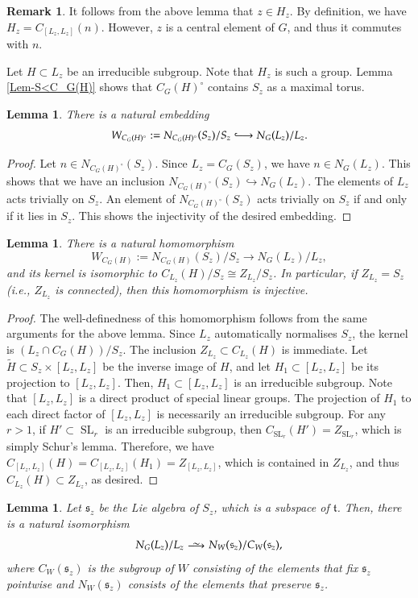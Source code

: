 \documentclass[11pt,oneside,dvipsnames]{amsart}
\theoremstyle{plain}
\newtheorem{Lem}[Thm]{Lemma}
\theoremstyle{definition}
\newtheorem{Rem}[Thm]{Remark}
\theoremstyle{named}
\DeclareMathOperator{\lisom}{\!\!\smash{\begin{array}{c}\sim\\[-1em]
\longrightarrow\end{array}}\!\!}
\DeclareMathOperator{\SL}{SL}
\newcommand{\hooklongrightarrow}{\lhook\joinrel\longrightarrow}
\begin{document}
\begin{Rem}
It follows from the above lemma that $z\in H_z$. By definition, we have $H_z=C_{[L_z,L_z]}(n)$. However, $z$ is a central element of $G$, and thus it commutes with $n$.
\end{Rem}

Let $H\subset L_z$ be an irreducible subgroup. Note that $H_z$ is such a group. Lemma \ref{Lem-S<C_G(H)} shows that $C_G(H)^{\circ}$ contains $S_z$ as a maximal torus.  
\begin{Lem}\label{Lem-W{circ}->N(L)/L}
There is a natural embedding
$$
W_{C_G(H)^{\circ}}:=N_{C_G(H)^{\circ}}(S_z)/S_z\hooklongrightarrow N_G(L_z)/L_z.
$$
\end{Lem}
\begin{proof}
Let $n\in N_{C_G(H)^{\circ}}(S_z)$. Since $L_z=C_G(S_z)$, we have $n\in N_G(L_z)$. This shows that we have an inclusion $N_{C_G(H)^{\circ}}(S_z)\hookrightarrow N_G(L_z)$. The elements of $L_z$ acts trivially on $S_z$. An element of $N_{C_G(H)^{\circ}}(S_z)$ acts trivially on $S_z$ if and only if it lies in $S_z$. This shows the injectivity of the desired embedding.
\end{proof}
\begin{Lem}\label{Lem-W->N(L)/L}
There is a natural homomorphism
$$
W_{C_G(H)}:=N_{C_G(H)}(S_z)/S_z\longrightarrow N_G(L_z)/L_z,
$$
and its kernel is isomorphic to $C_{L_z}(H)/S_z\cong Z_{L_z}/S_z$. In particular, if $Z_{L_z}=S_z$ (i.e., $Z_{L_z}$ is connected), then this homomorphism is injective.
\end{Lem}
\begin{proof}
The well-definedness of this homomorphism follows from the same arguments for the above lemma. Since $L_z$ automatically normalises $S_z$, the kernel is $(L_z\cap C_G(H))/S_z$. The inclusion $Z_{L_z}\subset C_{L_z}(H)$ is immediate. Let $\tilde{H}\subset S_z\times [L_z,L_z]$ be the inverse image of $H$, and let $H_1\subset[L_z,L_z]$ be its projection to $[L_z,L_z]$. Then, $H_1\subset[L_z,L_z]$ is an irreducible subgroup. Note that $[L_z,L_z]$ is a direct product of special linear groups. The projection of $H_1$ to each direct factor of $[L_z,L_z]$ is necessarily an irreducible subgroup. For any $r>1$, if $H'\subset \SL_r$ is an irreducible subgroup, then $C_{\SL_r}(H')=Z_{\SL_r}$, which is simply Schur's lemma. Therefore, we have $C_{[L_z,L_z]}(H)=C_{[L_z,L_z]}(H_1)=Z_{[L_z,L_z]}$, which is contained in $Z_{L_z}$, and thus $C_{L_z}(H)\subset Z_{L_z}$, as desired.
\end{proof}
\begin{Lem}
Let $\mathfrak{s}_z$ be the Lie algebra of $S_z$, which is a subspace of $\mathfrak{t}$. Then, there is a natural isomorphism
$$
N_G(L_z)/L_z\lisom N_W(\mathfrak{s}_z)/C_W(\mathfrak{s}_z),
$$
where $C_W(\mathfrak{s}_z)$ is the subgroup of $W$ consisting of the elements that fix $\mathfrak{s}_z$ pointwise and $N_W(\mathfrak{s}_z)$ consists of the elements that preserve $\mathfrak{s}_z$.
\end{Lem}
\end{document}
